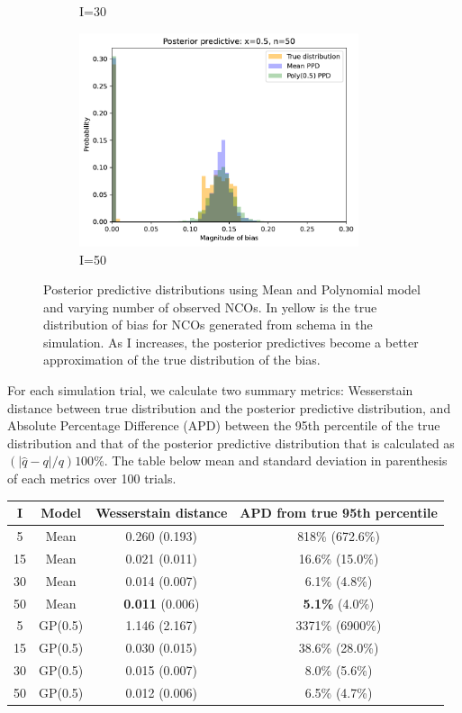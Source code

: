 \begin{figure}[H]
\begin{subfigure}{.45\textwidth}
	\caption{I=30}
\end{subfigure}%
\begin{subfigure}{.45\textwidth}
	\centering
	\includegraphics[width=0.9\textwidth]{figures/one-ppd-lrr-bias-50.pdf}
	\caption{I=50}
\end{subfigure}
\caption{Posterior predictive distributions using Mean and Polynomial model and varying number of observed NCOs. In yellow is the true distribution of bias for NCOs generated from schema in the simulation. As I increases, the posterior predictives become a better approximation of the true distribution of the bias.}
\end{figure}

For each simulation trial, we calculate two summary metrics: Wesserstain distance between true distribution and the posterior predictive distribution, and Absolute Percentage Difference (APD) between the 95th percentile of the true distribution and that of the posterior predictive distribution that is calculated as $(|\hat{q}-q|/q)100$\%. The table below mean and standard deviation in parenthesis of each metrics over 100 trials.

\begin{center}
\begin{tabular}{ |c|c|c|c| } 
\hline
I & Model & Wesserstain distance & APD from true 95th percentile\\ 
\hline
5 & Mean & 0.260 (0.193) & 818\% (672.6\%) \\
15 & Mean & 0.021 (0.011) & 16.6\% (15.0\%) \\
30 & Mean & 0.014 (0.007) & 6.1\% (4.8\%)\\
50 & Mean & \textbf{0.011} (0.006) & \textbf{5.1\%} (4.0\%)\\
5 & GP(0.5) & 1.146 (2.167) & 3371\% (6900\%)\\
15 & GP(0.5) & 0.030 (0.015) & 38.6\% (28.0\%)\\
30 & GP(0.5) & 0.015 (0.007) & 8.0\% (5.6\%)\\
50 & GP(0.5) & 0.012 (0.006) & 6.5\% (4.7\%)\\
\hline
\end{tabular}
\end{center}

